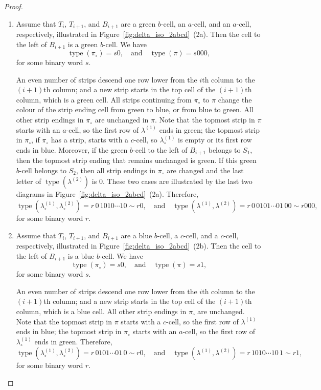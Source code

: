 \documentclass[11pt]{article}
\theoremstyle{definition}
\theoremstyle{remark}
\theoremstyle{definition}
\numberwithin{equation}{section}
\newcommand{\type}{\operatorname{type}}
\newcommand\qand{\quad\text{and}\quad}
\begin{document}
\begin{proof}
\begin{enumerate}[label=(2\alph*)]

\item Assume that \( T_i \), \( T_{i+1} \), and \( B_{i+1} \) are a green \( b \)-cell, an \( a \)-cell, and an \( a \)-cell, respectively, illustrated in Figure~\ref{fig:delta_iso_2abcd}~(2a). Then the cell to the
  left of \( B_{i+1} \) is a green \( b \)-cell. We have
  \[
    \type(\pi_\circ)=s0, \qand \type(\pi)=s000,
  \]
  for some binary word \(s\).

  An even number of strips descend one row lower from the \(i\)th
  column to the \((i+1)\)th column; and a new strip starts in the top
  cell of the \((i+1)\)th column, which is a green cell. All strips
  continuing from \(\pi_\circ\) to \(\pi\) change the colour of the
  strip ending cell from green to blue, or from blue to green. All
  other strip endings in \(\pi_\circ\) are unchanged in \(\pi\). Note
  that the topmost strip in \(\pi\) starts with an \(a\)-cell, so the
  first row of \(\lambda^{(1)}\) ends in green; the topmost strip in
  \(\pi_\circ\), if \(\pi_\circ\) has a strip, starts with a
  \(c\)-cell, so \(\lambda_\circ^{(1)}\) is empty or its first row
  ends in blue. Moreover, if the green \(b\)-cell to the left of
  \( B_{i+1} \) belongs to \(S_1\), then the topmost strip ending that
  remains unchanged is green. If this green \(b\)-cell belongs to
  \(S_2\), then all strip endings in \(\pi_\circ\) are changed and the
  last letter of \(\type(\lambda^{(2)})\) is \(0\). These two cases
  are illustrated by the last two diagrams in
  Figure~\ref{fig:delta_iso_2abcd}~(2a). Therefore,
  \[
    \type(\lambda_\circ^{(1)},\lambda_\circ^{(2)})=r\,0\,1010\cdots10\sim r0, \qand \type(\lambda^{(1)},\lambda^{(2)})=r\,0\,0101\cdots01\,00\sim r000,
  \]
  for some binary word \(r\). 
  
\item Assume that \( T_i \), \( T_{i+1} \), and \( B_{i+1} \) are a blue \( b \)-cell, a \( c \)-cell, and a \( c \)-cell, respectively,
  illustrated in Figure~\ref{fig:delta_iso_2abcd}~(2b). Then the cell to the
  left of \( B_{i+1} \) is a blue \(b\)-cell. We have
  \[
    \type(\pi_\circ)=s0, \qand \type(\pi)=s1,
  \]
  for some binary word \(s\).

  An even number of strips descend one row lower from the \(i\)th
  column to the \((i+1)\)th column; and a new strip starts in the top
  cell of the \((i+1)\)th column, which is a blue cell. All other
  strip endings in \(\pi_\circ\) are unchanged. Note that the topmost
  strip in \(\pi\) starts with a \(c\)-cell, so the first row of
  \(\lambda^{(1)}\) ends in blue; the topmost strip in \(\pi_\circ\)
  starts with an \(a\)-cell, so the first row of \(\lambda_\circ^{(1)}\)
  ends in green. Therefore,
  \[
    \type(\lambda_\circ^{(1)},\lambda_\circ^{(2)})=r\,0101\cdots01\,0\sim r0, \qand \type(\lambda^{(1)},\lambda^{(2)})=r\,1010\cdots10\,1\sim r1,
  \]
  for some binary word \(r\).


\end{enumerate}
\end{proof}
\end{document}
